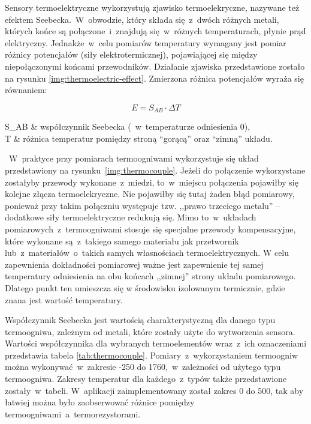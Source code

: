 Sensory termoelektryczne wykorzystują zjawisko termoelekryczne, nazywane też efektem
Seebecka.~W~obwodzie, który składa się~z~dwóch różnych metali, których końce są połączone~i~znajdują
się~w~różnych temperaturach, płynie prąd elektryczny. Jednakże~w~celu pomiarów temperatury wymagany
jest pomiar różnicy potencjałów (siły elektrotermicznej), pojawiającej się między niepołączonymi
końcami przewodników. Działanie zjawiska przedstawione zostało na rysunku
\ref{img:thermoelectric-effect}. Zmierzona różnica potencjałów wyraża się równaniem:

\begin{equation}\label{eqn:voltage-thermocouple}
  E = S_{AB}\cdot\Delta T
\end{equation}

\begin{eqparams}
  S_{AB} & współczynnik Seebecka (~w~temperaturze odniesienia 0\degC), \\
  \Delta T & różnica temperatur pomiędzy stroną \enquote{gorącą} oraz \enquote{zimną} układu.
\end{eqparams}


~W~praktyce przy pomiarach termoogniwami wykorzystuje się układ przedstawiony na
rysunku~\ref{img:thermocouple}. Jeżeli do połączenie wykorzystane zostałyby przewody
wykonane~z~miedzi, to~w~miejscu połączenia pojawiłby się kolejne złącza termoelekryczne. Nie
pojawiłby się tutaj żaden błąd pomiarowy, ponieważ przy takim połączniu występuje tzw. ,,prawo
trzeciego metalu'' -- dodatkowe siły termoelektryczne redukują się. Mimo to~w~układach
pomiarowych~z~termoogniwami stosuje się specjalne przewody kompensacyjne, które wykonane
są~z~takiego samego materiału jak przetwornik lub~z~materiałów~o~takich samych własnościach
termoelektrycznych. W celu zapewnienia dokładności pomiarowej ważne jest zapewnienie tej samej
temperatury odniesienia na obu końcach ,,zimnej'' strony układu pomiarowego. Dlatego punkt ten
umieszcza się w środowisku izolowanym termicznie, gdzie znana jest wartość temperatury.


Współczynnik Seebecka jest wartością charakterystyczną dla danego typu termoogniwa, zależnym od
metali, które zostały użyte do wytworzenia sensora. Wartości współczynnika \cite{thermocouple} dla
wybranych termoelementów wraz~z~ich oznaczeniami przedstawia tabela \ref{tab:thermocouple}.
Pomiary~z~wykorzystaniem termoogniw można wykonywać~w~zakresie -250 do 1760\degC,~w~zależności od
użytego typu termoogniwa. Zakresy temperatur dla każdego~z~typów także przedstawione
zostały~w~tabeli. W~aplikacji zaimplementowany został zakres 0 do 500\degC, tak aby łatwiej można
było zaobserwować różnice pomiędzy termoogniwami~a~termorezystorami.

